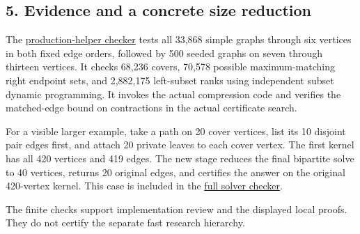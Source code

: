 \hypertarget{af-e51d4b9b02-evidence-and-a-concrete-size-reduction}{%
\subsection{5. Evidence and a concrete size reduction}\label{af-e51d4b9b02-evidence-and-a-concrete-size-reduction}}

The \href{https://github.com/icekylinx/algorithm-frontier/blob/main/problems/general-matching/verify/check_cover_compression.py}{production-helper checker} tests all 33,868 simple graphs through six vertices in both fixed edge orders, followed by 500 seeded graphs on seven through thirteen vertices. It checks 68,236 covers, 70,578 possible maximum-matching right endpoint sets, and 2,882,175 left-subset ranks using independent subset dynamic programming. It invokes the actual compression code and verifies the matched-edge bound on contractions in the actual certificate search.

For a visible larger example, take a path on 20 cover vertices, list its 10 disjoint pair edges first, and attach 20 private leaves to each cover vertex. The first kernel has all 420 vertices and 419 edges. The new stage reduces the final bipartite solve to 40 vertices, returns 20 original edges, and certifies the answer on the original 420-vertex kernel. This case is included in the \href{https://github.com/icekylinx/algorithm-frontier/blob/main/problems/general-matching/verify/check_reference.py}{full solver checker}.

The finite checks support implementation review and the displayed local proofs. They do not certify the separate fast research hierarchy.
